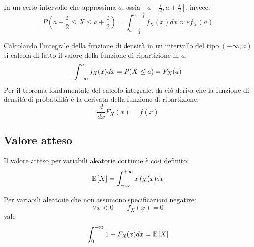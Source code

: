 In un certo intervallo che approssima $a$, ossia $[a-\frac{\varepsilon}{2},a+\frac{\varepsilon}{2}]$, invece:
\begin{equation*}
	P\left(a - \frac{\varepsilon}{2}\leq X\leq a + \frac{\varepsilon}{2}\right) = \int_{a - \frac{\varepsilon}{2}}^{a + \frac{\varepsilon}{2}} f_X(x)dx \approx \varepsilon f_X(a)
\end{equation*}

Calcolando l'integrale della funzione di densità in un intervallo del tipo $(-\infty,a)$ si calcola di fatto il valore della funzione di ripartizione in $a$:
\begin{equation*}
	\int_{-\infty}^a f_X(x)dx = P(X\leq a) = F_X(a) \\
\end{equation*}
Per il teorema fondamentale del calcolo integrale, da ciò deriva che la funzione di densità di probabilità è la derivata della funzione di ripartizione:
\begin{equation*}
	\frac{d}{dx}F_X(x)=f(x)
\end{equation*}

\subsection{Valore atteso}
\begin{defin}
	Il valore atteso per variabili aleatorie continue è così definito:
	\begin{equation*}
		\mathbb{E}\left[ X \right]=\int_{-\infty}^{+\infty} x f_X(x)dx
	\end{equation*}
\end{defin}

\begin{prop} \label{prop:valatnonneg}
	Per variabili aleatorie che non assumono specificazioni negative:
	\begin{equation*}
		\forall x<0 \qquad f_X(x)=0
	\end{equation*}
	vale
	\begin{equation*}
		\int_0^{+\infty} 1-F_X(x)dx = \mathbb{E}\left[ X \right]
	\end{equation*}
\end{prop}

